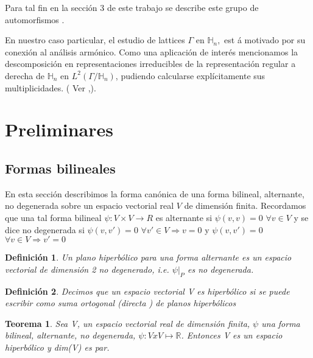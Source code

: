 \documentclass[12pt]{article}
\newtheorem{theorem}{Teorema}
\newtheorem{definition}{Definición}
\begin{document}
Para tal fin en la sección 3 de este trabajo se describe este grupo de
automorfismos .

En nuestro caso particular, el estudio de lattices $\Gamma $ en $\mathbb{H}_n,$ est%
á motivado por su conexión al análisis armónico. Como una
aplicación de inter\'{e}s mencionamos la descomposición en
representaciones irreducibles de la representación regular a derecha de
$\mathbb{H}_n$ en $L^2(\Gamma /\mathbb{H}_n)$, pudiendo calcularse
explícitamente sus multiplicidades. ( Ver \cite{Fo} ,\cite{Th}).

\section{Preliminares}
\subsection{Formas bilineales}
En esta sección describimos la forma canónica de una forma bilineal,
alternante, no degenerada sobre un espacio vectorial real $V$ de dimensión finita. 
Recordamos que una tal forma bilineal $\psi :V\times V\rightarrow R$
es alternante si $\psi(v,v)=0$ $\forall v \in V$  y se dice no degenerada si 
$\psi(v,v')=0$ $\forall v' \in V \Rightarrow v = 0$  y 
$\psi(v,v')=0$ $\forall v \in V \Rightarrow v' = 0$

\begin{definition} 
 Un plano hiperbólico para una forma alternante es un espacio vectorial de dimensión 2 no degenerado,
  i.e. $\psi|_P$ es no degenerada. 
\end{definition}

\begin{definition}   
 Decimos que un espacio vectorial V es hiperbólico si se puede escribir como suma ortogonal (directa ) de
 planos hiperbólicos
\end{definition}

\begin{theorem} \label{Lang-8.1}
 Sea V, un espacio vectorial real de dimensión finita, $\psi$ una forma bilineal, alternante, no degenerada, 
 $\psi:VxV\mapsto \mathbb{R}$. Entonces V es un espacio hiperbólico y dim(V) es par.
\end{theorem}
\end{document}
